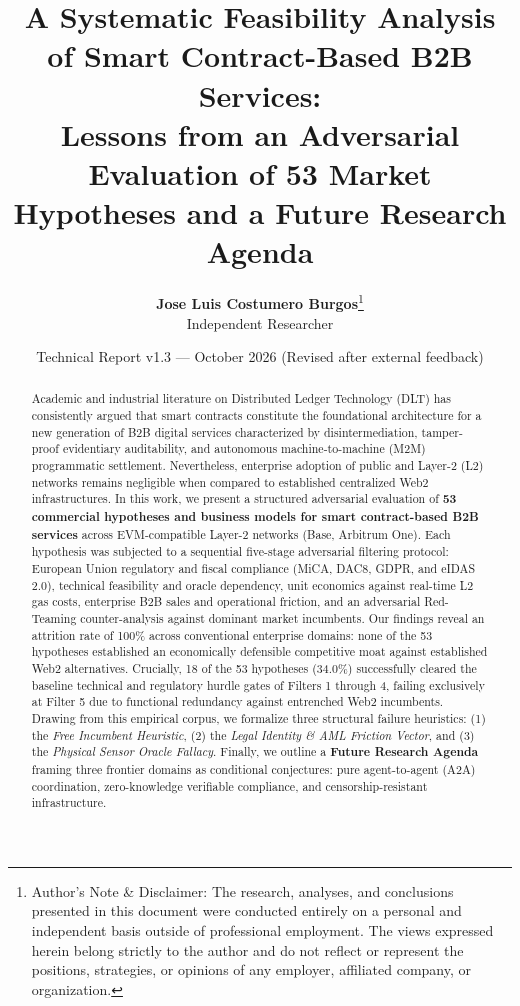 \documentclass[10pt,a4paper]{article}
\title{\textbf{\LARGE A Systematic Feasibility Analysis of Smart Contract-Based B2B Services:}\\ \Large Lessons from an Adversarial Evaluation of 53 Market Hypotheses and a Future Research Agenda}
\author{\textbf{Jose Luis Costumero Burgos}\thanks{Author's Note \& Disclaimer: The research, analyses, and conclusions presented in this document were conducted entirely on a personal and independent basis outside of professional employment. The views expressed herein belong strictly to the author and do not reflect or represent the positions, strategies, or opinions of any employer, affiliated company, or organization.}\\ \small Independent Researcher}
\date{Technical Report v1.3 --- October 2026 (Revised after external feedback)}
\begin{document}
\maketitle

\begin{abstract}
\noindent Academic and industrial literature on Distributed Ledger Technology (DLT) has consistently argued that smart contracts constitute the foundational architecture for a new generation of B2B digital services characterized by disintermediation, tamper-proof evidentiary auditability, and autonomous machine-to-machine (M2M) programmatic settlement. Nevertheless, enterprise adoption of public and Layer-2 (L2) networks remains negligible when compared to established centralized Web2 infrastructures. In this work, we present a structured adversarial evaluation of \textbf{53 commercial hypotheses and business models for smart contract-based B2B services} across EVM-compatible Layer-2 networks (Base, Arbitrum One). Each hypothesis was subjected to a sequential five-stage adversarial filtering protocol: European Union regulatory and fiscal compliance (MiCA, DAC8, GDPR, and eIDAS 2.0), technical feasibility and oracle dependency, unit economics against real-time L2 gas costs, enterprise B2B sales and operational friction, and an adversarial Red-Teaming counter-analysis against dominant market incumbents. Our findings reveal an attrition rate of 100\% across conventional enterprise domains: none of the 53 hypotheses established an economically defensible competitive moat against established Web2 alternatives. Crucially, 18 of the 53 hypotheses (34.0\%) successfully cleared the baseline technical and regulatory hurdle gates of Filters 1 through 4, failing exclusively at Filter 5 due to functional redundancy against entrenched Web2 incumbents. Drawing from this empirical corpus, we formalize three structural failure heuristics: (1) the \textit{Free Incumbent Heuristic}, (2) the \textit{Legal Identity \& AML Friction Vector}, and (3) the \textit{Physical Sensor Oracle Fallacy}. Finally, we outline a \textbf{Future Research Agenda} framing three frontier domains as conditional conjectures: pure agent-to-agent (A2A) coordination, zero-knowledge verifiable compliance, and censorship-resistant infrastructure.
\end{abstract}
\end{document}
